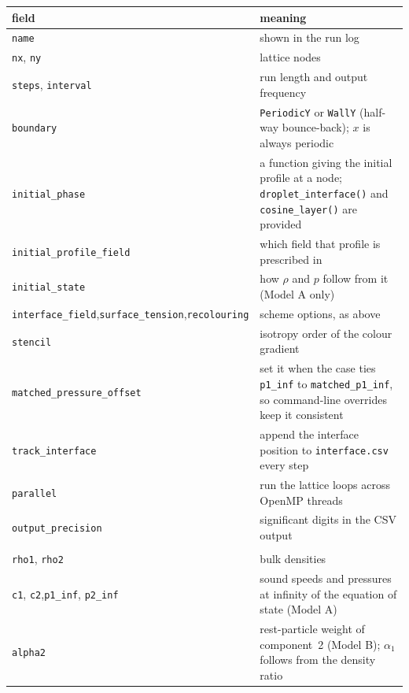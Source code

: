 \documentclass[11pt,a4paper]{article}
\theoremstyle{plain}
\theoremstyle{definition}
\begin{document}
\begin{center}\small
\begin{tabular}{@{}p{5.0cm}p{9.2cm}@{}}
\toprule
field & meaning \\
\midrule
\texttt{name}                & shown in the run log \\
\texttt{nx}, \texttt{ny}     & lattice nodes \\
\texttt{steps}, \texttt{interval} & run length and output frequency \\
\texttt{boundary}            & \texttt{PeriodicY} or \texttt{WallY} (half-way bounce-back); $x$ is always periodic \\
\texttt{initial\_phase}      & a function giving the initial profile at a node; \texttt{droplet\_interface()} and \texttt{cosine\_layer()} are provided \\
\texttt{initial\_profile\_field} & which field that profile is prescribed in \\
\texttt{initial\_state}      & how $\rho$ and $p$ follow from it (Model A only) \\
\texttt{interface\_field},\newline \texttt{surface\_tension},\newline \texttt{recolouring} & scheme options, as above \\
\texttt{stencil}             & isotropy order of the colour gradient \\
\texttt{matched\_pressure\_}\newline\texttt{offset} & set it when the case ties \texttt{p1\_inf} to \texttt{matched\_p1\_inf}, so command-line overrides keep it consistent \\
\texttt{track\_interface}    & append the interface position to \texttt{interface.csv} every step \\
\texttt{parallel}            & run the lattice loops across OpenMP threads \\
\texttt{output\_precision}   & significant digits in the CSV output \\
\addlinespace
\multicolumn{2}{l}{\texttt{physics}, all in lattice units}\\
\texttt{rho1}, \texttt{rho2} & bulk densities \\
\texttt{c1}, \texttt{c2},\newline \texttt{p1\_inf}, \texttt{p2\_inf} & sound speeds and pressures at infinity of the equation of state (Model A) \\
\texttt{alpha2}              & rest-particle weight of component~2 (Model B); $\alpha_1$ follows from the density ratio \\

\end{tabular}
\end{center}
\end{document}
